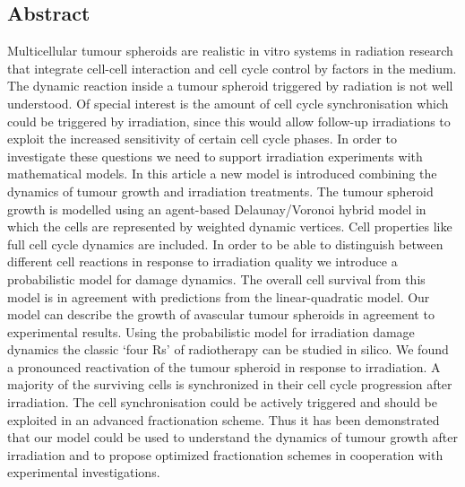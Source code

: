 \documentclass[11pt,a4paper]{article}
\begin{document}
\subsection*{Abstract}
Multicellular tumour spheroids are realistic in vitro systems in radiation research that integrate cell-cell interaction and cell cycle control by factors in the medium. The dynamic reaction inside a tumour spheroid triggered by radiation is not well understood. Of special interest is the amount of cell cycle synchronisation which could be triggered by irradiation, since this would allow follow-up irradiations to exploit the increased sensitivity of certain cell cycle phases. In order to investigate these questions we need to support irradiation experiments with mathematical models. In this article a new model is introduced combining the dynamics of tumour growth and irradiation treatments. The tumour spheroid growth is modelled using an agent-based Delaunay/Voronoi hybrid model in which the cells are represented by weighted dynamic vertices. Cell properties like full cell cycle dynamics are included. In order to be able to distinguish between different cell reactions in response to irradiation quality we introduce a probabilistic model for damage dynamics. The overall cell survival from this model is in agreement with predictions from the linear-quadratic model. Our model can describe the growth of avascular tumour spheroids in agreement to experimental results. Using the probabilistic model for irradiation damage dynamics the classic ‘four Rs’ of radiotherapy can be studied in silico. We found a pronounced reactivation of the tumour spheroid in response to irradiation. A majority of the surviving cells is synchronized in their cell cycle progression after irradiation. The cell synchronisation could be actively triggered and should be exploited in an advanced fractionation scheme. Thus it has been demonstrated that our model could be used to understand the dynamics of tumour growth after irradiation and to propose optimized fractionation schemes in cooperation with experimental investigations.  
\end{document}

